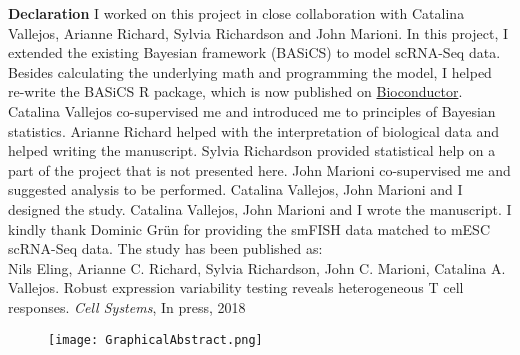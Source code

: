 \begin{Comment}
\textbf{Declaration} I worked on this project in close collaboration with Catalina Vallejos, Arianne Richard, Sylvia Richardson and John Marioni. In this project, I extended the existing Bayesian framework (BASiCS) to model scRNA-Seq data. Besides calculating the underlying math and programming the model, I helped re-write the BASiCS R package, which is now published on \href{https://bioconductor.org/packages/release/bioc/html/BASiCS.html}{Bioconductor}. Catalina Vallejos co-supervised me and introduced me to principles of Bayesian statistics. Arianne Richard helped with the interpretation of biological data and helped writing the manuscript. Sylvia Richardson provided statistical help on a part of the project that is not presented here. John Marioni co-supervised me and suggested analysis to be performed. Catalina Vallejos, John Marioni and I designed the study. Catalina Vallejos, John Marioni and I wrote the manuscript. I kindly thank Dominic Gr\"un for providing the smFISH data matched to mESC scRNA-Seq data. The study has been published as:\\

Nils Eling, Arianne C. Richard, Sylvia Richardson, John C. Marioni, Catalina A. Vallejos. Robust expression variability testing reveals heterogeneous T cell responses. \emph{Cell Systems}, In press, 2018 
\end{Comment}

\begin{figure}[hb]
\centering    
\texttt{[image: GraphicalAbstract.png]}
\end{figure}

\newpage


\newpage

\newpage


